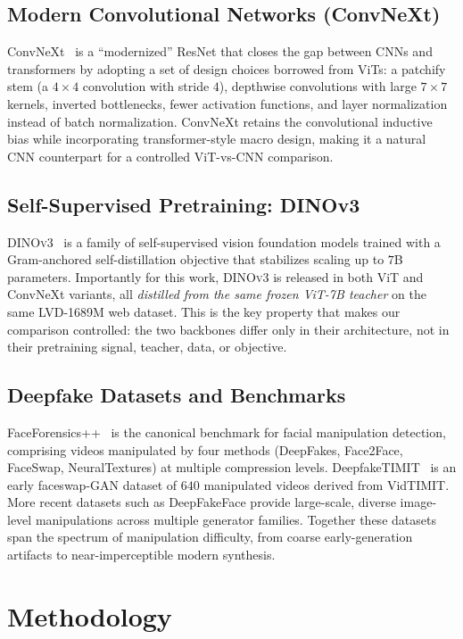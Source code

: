 \documentclass[11pt,a4paper]{article}
\begin{document}
\subsection{Modern Convolutional Networks (ConvNeXt)}
ConvNeXt~\cite{liu2022convnext} is a ``modernized'' ResNet that closes the gap between CNNs and
transformers by adopting a set of design choices borrowed from ViTs: a patchify stem (a $4\times4$
convolution with stride $4$), depthwise convolutions with large $7\times7$ kernels, inverted
bottlenecks, fewer activation functions, and layer normalization instead of batch normalization.
ConvNeXt retains the convolutional inductive bias while incorporating transformer-style macro
design, making it a natural CNN counterpart for a controlled ViT-vs-CNN comparison.

\subsection{Self-Supervised Pretraining: DINOv3}
\textsc{DINOv3}~\cite{dinov3} is a family of self-supervised vision foundation models trained
with a Gram-anchored self-distillation objective that stabilizes scaling up to $7$B parameters.
Importantly for this work, \textsc{DINOv3} is released in both ViT and ConvNeXt variants, all
\emph{distilled from the same frozen ViT-7B teacher} on the same LVD-1689M web dataset. This is
the key property that makes our comparison controlled: the two backbones differ only in their
architecture, not in their pretraining signal, teacher, data, or objective.

\subsection{Deepfake Datasets and Benchmarks}
FaceForensics++~\cite{rossler2019faceforensics} is the canonical benchmark for facial
manipulation detection, comprising videos manipulated by four methods (DeepFakes, Face2Face,
FaceSwap, NeuralTextures) at multiple compression levels. DeepfakeTIMIT~\cite{korshunov2018deepfakes}
is an early faceswap-GAN dataset of $640$ manipulated videos derived from VidTIMIT. More recent
datasets such as DeepFakeFace provide large-scale, diverse image-level manipulations across
multiple generator families. Together these datasets span the spectrum of manipulation difficulty,
from coarse early-generation artifacts to near-imperceptible modern synthesis.

\section{Methodology}
\end{document}
